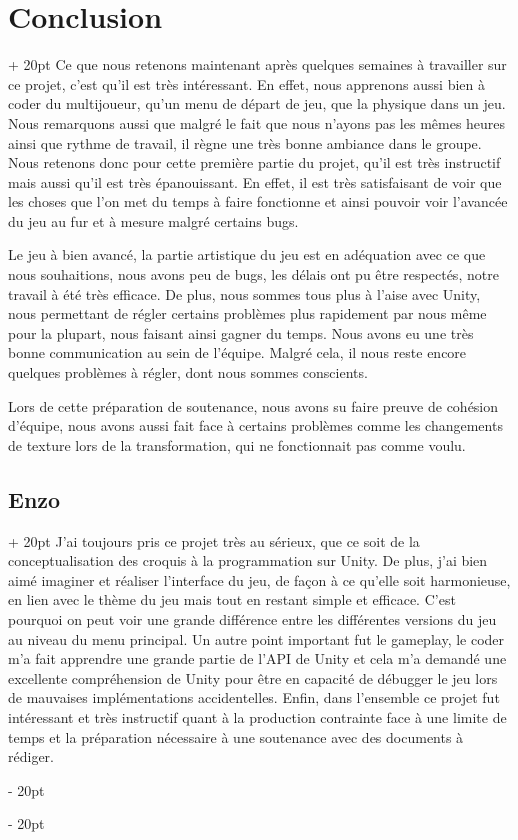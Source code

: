 \documentclass[a4paper, 12pt, twoside]{article}
\newcommand{\ind}[1][20pt]{\advance\leftskip + #1}
\newcommand{\deind}[1][20pt]{\advance\leftskip - #1}
\newenvironment{indt}[2][20pt]{#2 \par \ind[#1]}{\par \deind} %
\begin{document}
    \begin{indt}{\section{Conclusion}}
        Ce que nous retenons maintenant après quelques semaines à travailler sur ce projet, c'est qu'il est très intéressant. En effet, nous apprenons aussi bien à coder du multijoueur, qu'un menu de départ de jeu, que la physique dans un jeu.  Nous remarquons aussi que malgré le fait que nous n'ayons pas les mêmes heures ainsi que rythme de travail, il règne une très bonne ambiance dans le groupe. Nous retenons donc pour cette première partie du projet, qu'il est très instructif mais aussi qu'il est très épanouissant. En effet, il est très satisfaisant de voir que les choses que l'on met du temps à faire fonctionne et ainsi pouvoir voir l'avancée du jeu au fur et à mesure malgré certains bugs.

        Le jeu à bien avancé, la partie artistique du jeu est en adéquation avec ce que nous souhaitions, nous avons peu de bugs, les délais ont pu être respectés, notre travail à été très efficace. De plus, nous sommes tous plus à l'aise avec Unity, nous permettant de régler certains problèmes plus rapidement par nous même pour la plupart, nous faisant ainsi gagner du temps. Nous avons eu une très bonne communication au sein de l'équipe. Malgré cela, il nous reste encore quelques problèmes à régler, dont nous sommes conscients.
        
        Lors de cette préparation de soutenance, nous avons su faire preuve de cohésion d'équipe, nous avons aussi fait face à certains problèmes comme les changements de texture lors de la transformation, qui ne fonctionnait pas comme voulu.

        \begin{indt}{\subsection{Enzo}}
            J'ai toujours pris ce projet très au sérieux, que ce soit de la conceptualisation des croquis à la programmation sur Unity. De plus, j'ai bien aimé imaginer et réaliser l'interface du jeu, de façon à ce qu'elle soit harmonieuse, en lien avec le thème du jeu mais tout en restant simple et efficace. C'est pourquoi on peut voir une grande différence entre les différentes versions du jeu au niveau du menu principal. Un autre point important fut le gameplay, le coder m'a fait apprendre une grande partie de l'API de Unity et cela m'a demandé une excellente compréhension de Unity pour être en capacité de débugger le jeu lors de mauvaises implémentations accidentelles. Enfin, dans l'ensemble ce projet fut intéressant et très instructif quant à la production contrainte face à une limite de temps et la préparation nécessaire à une soutenance avec des documents à rédiger.


\end{indt}
\end{indt}
\end{document}
